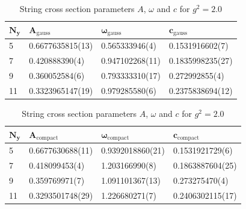 \begin{table}[!hb]
\centering
\begin{tabular}{llll}
    $\mathbf{N_y}$ & $\mathbf{A_\mathrm{gauss}}$ & $\mathbf{\omega_\mathrm{gauss}}$ & $\mathbf{c_\mathrm{gauss}}$ \\ \hline
   5 & 0.6677635815(13) & 0.565333946(4) & 0.1531916602(7) \\
   7 & 0.420888390(4) & 0.947102268(11) & 0.1835998235(27) \\
   9 & 0.360052584(6) & 0.793333310(17) & 0.272992855(4) \\
   11 & 0.3323965147(19) & 0.979285580(6) & 0.2375838694(12) \\
\end{tabular}
\begin{tabular}{llll}
    $\mathbf{N_y}$ & $\mathbf{A_\mathrm{compact}}$ & $\mathbf{\omega_\mathrm{compact}}$ & $\mathbf{c_\mathrm{compact}}$ \\ \hline
   5 & 0.6677630688(11) & 0.9392018860(21) & 0.1531921729(6) \\
   7 & 0.418099453(4) & 1.203166990(8) & 0.1863887604(25) \\
   9 & 0.359769971(7) & 1.091101367(13) & 0.273275470(4) \\
   11 & 0.3293501748(29) & 1.226680271(7) & 0.2406302115(17) \\
\end{tabular}
\caption{String cross section parameters $A$, $\omega$ and $c$ for $g^2=2.0$}
\end{table}
